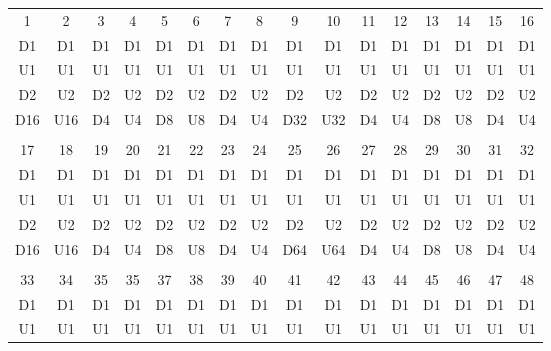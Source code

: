 \begin{table}[H]
\centering
\begin{tabular}{|c|c|c|c|c|c|c|c|c|c|c|c|c|c|c|c|}
\hline
\rowcolor[HTML]{C0C0C0} 
\multicolumn{16}{|c|}{\cellcolor[HTML]{C0C0C0}Sample}                             \\ \hline
\rowcolor[HTML]{C0C0C0} 
1   & 2   & 3  & 4  & 5  & 6  & 7  & 8  & 9   & 10  & 11 & 12 & 13 & 14 & 15 & 16 \\ \hline
D1  & D1  & D1 & D1 & D1 & D1 & D1 & D1 & D1  & D1  & D1 & D1 & D1 & D1 & D1 & D1 \\ \hline
U1  & U1  & U1 & U1 & U1 & U1 & U1 & U1 & U1  & U1  & U1 & U1 & U1 & U1 & U1 & U1 \\ \hline
D2  & U2  & D2 & U2 & D2 & U2 & D2 & U2 & D2  & U2  & D2 & U2 & D2 & U2 & D2 & U2 \\ \hline
D16 & U16 & D4 & U4 & D8 & U8 & D4 & U4 & D32 & U32 & D4 & U4 & D8 & U8 & D4 & U4 \\ \hline
\rowcolor[HTML]{C0C0C0} 
\multicolumn{16}{|c|}{\cellcolor[HTML]{C0C0C0}Sample}                             \\ \hline
\rowcolor[HTML]{C0C0C0} 
17  & 18  & 19 & 20 & 21 & 22 & 23 & 24 & 25  & 26  & 27 & 28 & 29 & 30 & 31 & 32 \\ \hline
D1  & D1  & D1 & D1 & D1 & D1 & D1 & D1 & D1  & D1  & D1 & D1 & D1 & D1 & D1 & D1 \\ \hline
U1  & U1  & U1 & U1 & U1 & U1 & U1 & U1 & U1  & U1  & U1 & U1 & U1 & U1 & U1 & U1 \\ \hline
D2  & U2  & D2 & U2 & D2 & U2 & D2 & U2 & D2  & U2  & D2 & U2 & D2 & U2 & D2 & U2 \\ \hline
D16 & U16 & D4 & U4 & D8 & U8 & D4 & U4 & D64 & U64 & D4 & U4 & D8 & U8 & D4 & U4 \\ \hline
\rowcolor[HTML]{C0C0C0} 
\multicolumn{16}{|c|}{\cellcolor[HTML]{C0C0C0}Sample}                             \\ \hline
\rowcolor[HTML]{C0C0C0} 
33  & 34  & 35 & 35 & 37 & 38 & 39 & 40 & 41  & 42  & 43 & 44 & 45 & 46 & 47 & 48 \\ \hline
D1  & D1  & D1 & D1 & D1 & D1 & D1 & D1 & D1  & D1  & D1 & D1 & D1 & D1 & D1 & D1 \\ \hline
U1  & U1  & U1 & U1 & U1 & U1 & U1 & U1 & U1  & U1  & U1 & U1 & U1 & U1 & U1 & U1 \\ \hline

\end{tabular}
\end{table}
